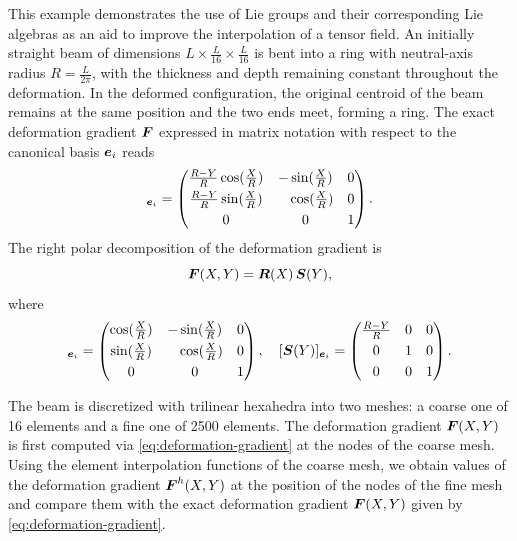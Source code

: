 \documentclass[12pt]{article}
\newcommand{\mbs}[1]{\boldsymbol{#1}}
\def\bS{{\mbs{S}}} \def\bT{{\mbs{T}}} \def\bU{{\mbs{U}}}
\begin{document}
This example demonstrates the use of Lie groups and their
corresponding Lie algebras as an aid to improve the interpolation of a
tensor field. An initially straight beam of dimensions $L \times
\frac{L}{16} \times \frac{L}{16}$ is bent into a ring with
neutral-axis radius $R = \frac{L}{2 \pi}$, with the thickness and
depth remaining constant throughout the deformation. In the deformed
configuration, the original centroid of the beam remains at the same
position and the two ends meet, forming a ring. The exact deformation
gradient $\bF$ expressed in matrix notation with respect to the
canonical basis $\be_i$ reads
\begin{equation}
  [\bF(X, Y)]_{\be_i} =
  \begin{pmatrix}
    \frac{R-Y}{R} \cos(\frac{X}{R}) & -\sin(\frac{X}{R}) & 0
    \\[0.3em]
    \frac{R-Y}{R} \sin(\frac{X}{R}) & \phantom{-}\cos(\frac{X}{R}) & 0
    \\[0.3em]
    0 & 0 & 1
  \end{pmatrix}.
  \label{eq:deformation-gradient} 
\end{equation}
The right polar decomposition of the deformation gradient is
\begin{equation}
  \bF(X,Y) = \bR(X) \, \bS(Y),
  \label{eq:right-polar}
\end{equation}
where
\begin{equation}
  [\bR(X)]_{\be_i} =
  \begin{pmatrix}
    \cos(\frac{X}{R}) & -\sin(\frac{X}{R}) & 0
    \\[0.3em]
    \sin(\frac{X}{R}) & \phantom{-}\cos(\frac{X}{R})  & 0
    \\[0.3em]
    0 & 0 & 1
  \end{pmatrix},
  \quad
  [\bS(Y)]_{\be_i} =
  \begin{pmatrix}
    \frac{R-Y}{R}  & 0 & 0
    \\[0.3em]
    0 & 1 & 0
    \\[0.3em]
    0 & 0 & 1
  \end{pmatrix}.
  \label{eq:polar-decomposition} 
\end{equation}

The beam is discretized with trilinear hexahedra into two meshes: a
coarse one of 16 elements and a fine one of 2500 elements. The
deformation gradient $\bF(X,Y)$ is first computed via
\eqref{eq:deformation-gradient} at the nodes of the coarse mesh. Using
the element interpolation functions of the coarse mesh, we obtain
values of the deformation gradient $\bF^{h}(X,Y)$ at the position of
the nodes of the fine mesh and compare them with the exact deformation
gradient $\bF(X,Y)$ given by \eqref{eq:deformation-gradient}.
\end{document}
